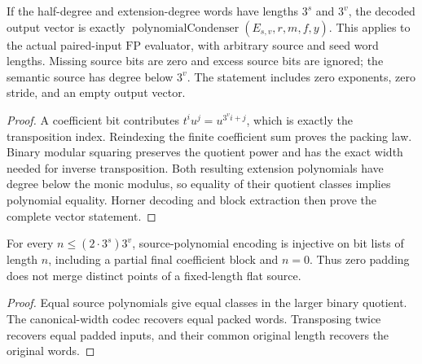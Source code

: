 \begin{theorem}
  \label{thm:lowerbounds-algebraic-encoded-condenser-correct}
  \leanok
  If the half-degree and extension-degree words have lengths $3^s$
  and $3^v$, the decoded output vector is exactly
  $\operatorname{polynomialCondenser}(E_{s,v},r,m,f,y)$.
  This applies to the actual paired-input $\mathrm{FP}$ evaluator,
  with arbitrary source and seed word lengths. Missing source bits
  are zero and excess source bits are ignored; the semantic source
  has degree below $3^v$. The statement includes zero exponents,
  zero stride, and an empty output vector.
\end{theorem}
\begin{proof}
  \leanok
  A coefficient bit contributes $t^iu^j=u^{3^vi+j}$, which is
  exactly the transposition index. Reindexing the finite coefficient
  sum proves the packing law. Binary modular squaring preserves the
  quotient power and has the exact width needed for inverse
  transposition. Both resulting extension polynomials have degree
  below the monic modulus, so equality of their quotient classes
  implies polynomial equality. Horner decoding and block extraction
  then prove the complete vector statement.
\end{proof}

\begin{theorem}
  \label{thm:lowerbounds-algebraic-encoded-source-injective}
  \leanok
  For every $n\le(2\cdot3^s)3^v$, source-polynomial encoding is
  injective on bit lists of length $n$, including a partial final
  coefficient block and $n=0$. Thus zero padding does not merge
  distinct points of a fixed-length flat source.
\end{theorem}
\begin{proof}
  \leanok
  Equal source polynomials give equal classes in the larger binary
  quotient. The canonical-width codec recovers equal packed words.
  Transposing twice recovers equal padded inputs, and their common
  original length recovers the original words.
\end{proof}

